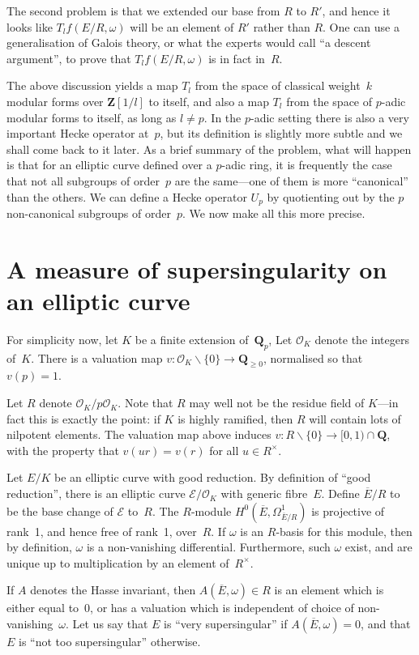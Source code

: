 \documentclass{article}
\newcommand{\E}{\mathcal E}
\newcommand{\Ebar}{\overline{E}}
\renewcommand{\O}{\mathcal O}
\newcommand{\Q}{\mathbf{Q}}
\newcommand{\Z}{\mathbf{Z}}
\begin{document}
The second problem is that we extended our base from $R$ to $R'$,
and hence it looks like $T_lf(E/R,\omega)$ will be an element of $R'$
rather than $R$. One can use a generalisation of Galois theory,
or what the experts would call ``a descent argument'', to prove that
$T_lf(E/R,\omega)$ is in fact in~$R$.

The above discussion yields a map $T_l$ from the space of classical
weight~$k$ modular forms over $\Z[1/l]$ to itself, and also
a map $T_l$ from the space of $p$-adic modular forms to itself,
as long as $l\not=p$. In the $p$-adic setting there is also a very
important Hecke operator at~$p$, but its definition is slightly more
subtle and we shall come back to it later. As a brief summary of the
problem, what will happen is that for an elliptic curve defined over
a $p$-adic ring, it is frequently the case that not all subgroups
of order~$p$ are the same---one of them is more ``canonical'' than the
others. We can define a Hecke operator $U_p$ by quotienting out
by the $p$ non-canonical subgroups of order~$p$. We now make all
this more precise.

\section{A measure of supersingularity on an elliptic curve}

For simplicity now, let $K$ be a finite extension of~$\Q_p$,
Let $\O_K$ denote the integers of~$K$. There is a valuation
map $v:\O_K\backslash\{0\}\to\Q_{\geq0}$, normalised so
that $v(p)=1$.

Let $R$ denote $\O_K/p\O_K$. Note that $R$ may well not be the
residue field of $K$---in fact this is exactly the point: if $K$
is highly ramified, then $R$ will contain lots of nilpotent elements.
The valuation map above induces $v:R\backslash\{0\}\to[0,1)\cap\Q$,
with the property that $v(ur)=v(r)$ for all $u\in R^\times$.

Let $E/K$ be an elliptic curve with good reduction. 
By definition of ``good reduction'',
there is an elliptic curve $\E/\O_K$ with generic fibre~$E$.
Define $\Ebar/R$ to be the base change of $\E$ to~$R$. The
$R$-module $H^0(\Ebar,\Omega^1_{\Ebar/R})$ is projective of rank~1,
and hence free of rank~1, over~$R$. If $\omega$ is an $R$-basis for
this module, then by definition, $\omega$ is a non-vanishing
differential. Furthermore, such $\omega$ exist, and are unique up to
multiplication by an element of~$R^\times$. 

If $A$ denotes the Hasse invariant, then $A(\Ebar,\omega)\in R$ is
an element which is either equal to~0, or has a valuation which
is independent of choice of non-vanishing~$\omega$. Let us say
that $E$ is ``very supersingular'' if $A(\Ebar,\omega)=0$, and
that $E$ is ``not too supersingular'' otherwise.
\end{document}
